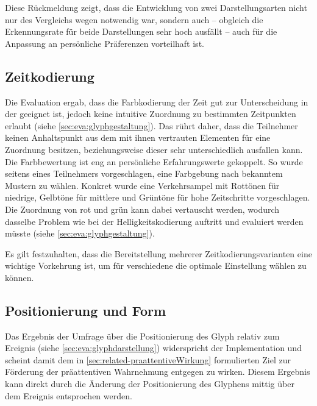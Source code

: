 Diese Rückmeldung zeigt, dass die Entwicklung von zwei Darstellungsarten nicht nur des Vergleichs wegen notwendig war, sondern auch -- obgleich die Erkennungsrate für beide Darstellungen sehr hoch ausfällt -- auch für die Anpassung an persönliche Präferenzen vorteilhaft ist.


\subsection*{Zeitkodierung}\label{sec:disc:farbgebung}
Die Evaluation ergab, dass die Farbkodierung der Zeit gut zur Unterscheidung in der  geeignet ist, jedoch keine intuitive Zuordnung zu bestimmten Zeitpunkten erlaubt (siehe \autoref{sec:eva:glyphgestaltung}). Das rührt daher, dass die Teilnehmer keinen Anhaltspunkt aus dem mit ihnen vertrauten Elementen für eine Zuordnung besitzen, beziehungsweise dieser sehr unterschiedlich ausfallen kann. Die Farbbewertung ist eng an persönliche Erfahrungswerte gekoppelt. So wurde seitens eines Teilnehmers vorgeschlagen, eine Farbgebung nach bekanntem Mustern zu wählen. Konkret wurde eine Verkehrsampel mit Rottönen für niedrige, Gelbtöne für mittlere und Grüntöne für hohe Zeitschritte  vorgeschlagen. Die Zuordnung von rot und grün kann dabei vertauscht werden, wodurch dasselbe Problem wie bei der Helligkeitskodierung auftritt und evaluiert werden müsste (siehe \autoref{sec:eva:glyphgestaltung}).

Es gilt festzuhalten, dass die Bereitstellung mehrerer Zeitkodierungsvarianten eine wichtige Vorkehrung ist, um für verschiedene  die optimale Einstellung wählen zu können.

\subsection*{Positionierung und Form}
Das Ergebnis der Umfrage über die Positionierung des Glyph relativ zum Ereignis (siehe \autoref{sec:eva:glyphdarstellung}) widerspricht der Implementation und scheint damit dem in \autoref{sec:related-praattentiveWirkung} formulierten Ziel zur Förderung der präattentiven Wahrnehmung entgegen zu wirken. Diesem Ergebnis kann direkt durch die Änderung der Positionierung des Glyphens mittig über dem Ereignis entsprochen werden.

